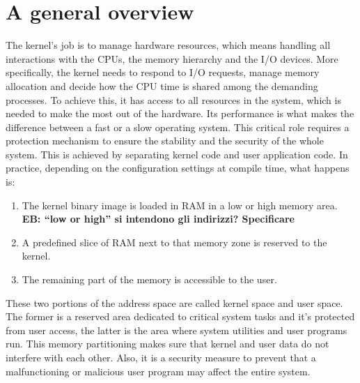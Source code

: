 \documentclass[10pt, oneside]{book}
\newcommand{\mycomment}[1]{\textbf{#1}}  %
\begin{document}
\section{A general overview} 
\label{sec:general}
The kernel's job is to manage hardware resources, which means handling all interactions with the CPUs, the memory hierarchy and the I/O devices. More specifically, the kernel needs to respond to I/O requests, manage memory allocation and decide how the CPU time is shared among the demanding processes. To achieve this, it has access to all resources in the system, which is needed to make the most out of the hardware. Its performance is what makes the difference between a fast or a slow operating system. This critical role requires a protection mechanism to ensure the stability and the security of the whole system. This is achieved by separating kernel code and user application code. In practice, depending on the configuration settings at compile time, what happens is: 
\begin{enumerate}
    \item The kernel binary image is loaded in RAM in a low or high memory area. \mycomment{EB: ``low or high'' si intendono gli indirizzi? Specificare}
    \item A predefined slice of RAM next to that memory zone is reserved to the kernel. 
    \item The remaining part of the memory is accessible to the user.
\end{enumerate}
These two portions of the address space %
are called kernel space and user space. The former is a reserved area dedicated to critical system tasks and it's protected from user access, the latter is the area where system utilities and user programs run. This memory partitioning makes sure that kernel and user data do not interfere with each other. Also, it is a security measure to prevent that a malfunctioning or malicious user program may affect the entire system.
\end{document}
